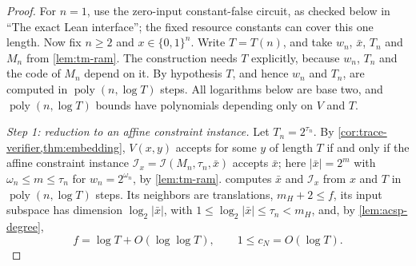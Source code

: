 \documentclass[11pt,letterpaper]{article}
\theoremstyle{definition}
\theoremstyle{remark}
\newcommand{\poly}{\operatorname{poly}}
\newcommand{\abs}[1]{\left|#1\right|}
\newcommand{\lgx}{\log_2}
\begin{document}
\begin{proof}
For \(n=1\), use the zero-input constant-false circuit, as checked
below in ``The exact Lean interface''; the fixed resource constants
can cover this one length. Now fix \(n\ge2\) and
\(x\in\{0,1\}^n\). Write \(T=T(n)\), and take \(w_n\),
\(\bar x\), \(T_n\) and \(M_n\) from \cref{lem:tm-ram}. The construction
needs \(T\) explicitly, because \(w_n\), \(T_n\) and the code of \(M_n\)
depend on it. By hypothesis \(T\), and hence \(w_n\) and \(T_n\), are
computed in \(\poly(n,\log T)\) steps. All logarithms below are base two, and
\(\poly(n,\log T)\) bounds have polynomials depending only on \(V\) and
\(T\).

\emph{Step 1: reduction to an affine constraint instance.} Let
\(T_n=2^{\tau_n}\). By \cref{cor:trace-verifier,thm:embedding},
\(V(x,y)\) accepts for some \(y\) of length \(T\) if and only if the
affine constraint instance \(\mathcal I_x=\mathcal I(M_n,\tau_n,\bar x)\)
accepts \(\bar x\); here \(\abs{\bar x}=2^m\) with
\(\omega_n\le m\le\tau_n\) for \(w_n=2^{\omega_n}\), by
\cref{lem:tm-ram}.  computes \(\bar x\) and
\(\mathcal I_x\) from \(x\) and \(T\) in \(\poly(n,\log T)\) steps. Its
neighbors are translations, \(m_H+2\le f\), its input subspace has
dimension \(\lgx\abs{\bar x}\), with \(1\le\lgx\abs{\bar x}\le\tau_n<m_H\),
and, by \cref{lem:acsp-degree},
\[
 f=\log T+O(\log\log T),\qquad 1\le c_N=O(\log T).
\]


\end{proof}
\end{document}
